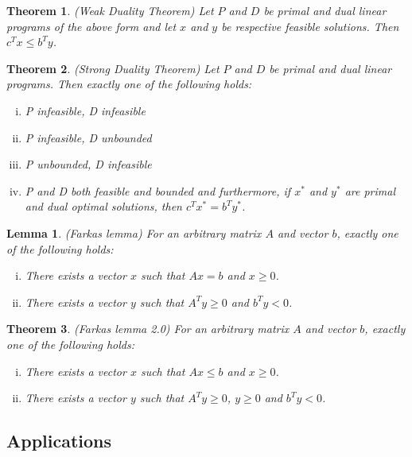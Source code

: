 \documentclass[12pt]{article}
\theoremstyle{plain}
\newtheorem*{theorem*}{Theorem}
\newtheorem*{lemma*}{Lemma}
\begin{document}
\begin{theorem*}{\textup{(Weak Duality Theorem)}}
    Let $P$ and $D$ be primal and dual linear programs of the above form and let $x$ and $y$ be respective feasible solutions. Then $c^Tx \leq b^Ty$.
\end{theorem*}

\begin{theorem*}{\textup{(Strong Duality Theorem)}}
    Let $P$ and $D$ be primal and dual linear programs. Then exactly one of the following holds:
    \begin{enumerate}[i)]
        \item P infeasible, D infeasible
        \item P infeasible, D unbounded
        \item P unbounded, D infeasible
        \item P and D both feasible and bounded and furthermore, if $x^*$ and $y^*$ are primal and dual optimal solutions, then $c^Tx^* = b^Ty^*$.
    \end{enumerate}
\end{theorem*}

\begin{lemma*}{\textup{(Farkas lemma)}}
    For an arbitrary matrix $A$ and vector $b$, exactly one of the following holds:
    \begin{enumerate}[i)]
        \item There exists a vector $x$ such that $Ax = b$ and $x \geq 0$.
        \item There exists a vector $y$ such that $A^Ty \geq 0$ and $b^Ty< 0$.
    \end{enumerate}
\end{lemma*}

\begin{theorem*}{\textup{(Farkas lemma 2.0)}}
    For an arbitrary matrix $A$ and vector $b$, exactly one of the following holds:
    \begin{enumerate}[i)]
        \item There exists a vector $x$ such that $Ax \leq b$ and $x \geq 0$.
        \item There exists a vector $y$ such that $A^Ty \geq 0$, $y\geq0$ and $b^Ty< 0$.
    \end{enumerate}
\end{theorem*}

\subsection{Applications}
\end{document}
